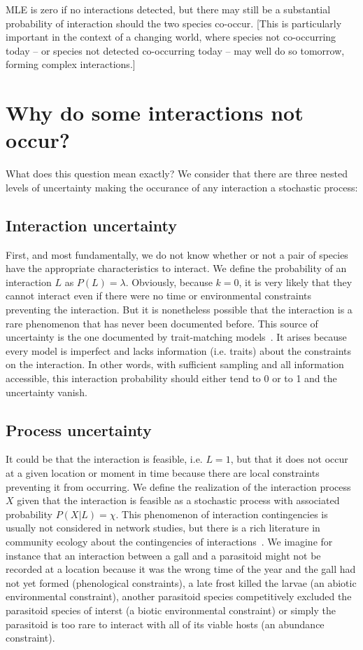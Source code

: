 ﻿\documentclass[12pt]{article}
\begin{document}
  MLE is zero if no interactions detected, but there may still be a substantial probability of interaction should the two species co-occur. [This is particularly important in the context of a changing world, where species not co-occurring today – or species not detected co-occurring today – may well do so tomorrow, forming complex interactions.]


\section*{Why do some interactions not occur?}

  What does this question mean exactly? We consider that there are three nested levels of uncertainty making the occurance of any interaction a stochastic process:  


    \subsection*{Interaction uncertainty} 

    First, and most fundamentally, we do not know whether or not a pair of species have the appropriate characteristics to interact. We define the probability of an interaction $L$ as $P(L)=\lambda$. Obviously, because $k=0$, it is very likely that they cannot interact even if there were no time or environmental constraints preventing the interaction. But it is nonetheless possible that the interaction is a rare phenomenon that has never been documented before. This source of uncertainty is the one documented by trait-matching models~\citep{}. It arises because every model is imperfect and lacks information (i.e. traits) about the constraints on the interaction. In other words, with sufficient sampling and all information accessible, this interaction probability should either tend to 0 or to 1 and the uncertainty vanish.  


    \subsection*{Process uncertainty} 

    It could be that the interaction is feasible, i.e. $L=1$, but that it does not occur at a given location or moment in time because there are local constraints preventing it from occurring. We define the realization of the interaction process $X$ given that the interaction is feasible as a stochastic process with associated probability $P(X|L)=\chi$. This phenomenon of interaction contingencies is usually not considered in network studies, but there is a rich literature in community ecology about the contingencies of interactions~\citep{}. We imagine for instance that an interaction between a gall and a parasitoid might not be recorded at a location because it was the wrong time of the year and the gall had not yet formed (phenological constraints), a late frost killed the larvae (an abiotic environmental constraint), another parasitoid species competitively excluded the parasitoid species of interst (a biotic environmental constraint) or simply the parasitoid is too rare to interact with all of its viable hosts (an abundance constraint). 
\end{document}
